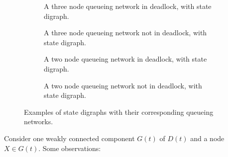 \documentclass{article}
\numberwithin{equation}{section}
\begin{document}
\begin{figure}[!htbp]
\begin{center}
  \begin{subfigure}{0.45\textwidth}
    \begin{center}
      
    \end{center}
    \caption{A three node queueing network in deadlock, with state digraph.}
    \label{fig:exampledigraph_deadlock}
  \end{subfigure}
  \hspace{6 mm}
  \begin{subfigure}{0.45\textwidth}
    \begin{center}
      
    \end{center}
    \caption{A three node queueing network not in deadlock, with state digraph.}
    \label{fig:exampledigraph_nodeadlock}
    \vspace{6 mm}
  \end{subfigure}
  \begin{subfigure}{0.45\textwidth}
    \begin{center}
      
    \end{center}
    \caption{A two node queueing network in deadlock, with state digraph.}
    \label{fig:exampledigraph2_nodeadlock}
  \end{subfigure}
  \hspace{6 mm}
  \begin{subfigure}{0.45\textwidth}
    \begin{center}
      
    \end{center}
    \caption{A two node queueing network not in deadlock, with state digraph.}
    \label{fig:exampledigraph2_nodeadlock}
    \vspace{6 mm}
  \end{subfigure}
  \end{center}
  \caption{Examples of state digraphs with their corresponding queueing networks.}
  \label{fig:exampledigraphs}
\end{figure}

Consider one weakly connected component $G(t)$ of $D(t)$ and a node $X \in G(t)$. Some observations:
\end{document}
